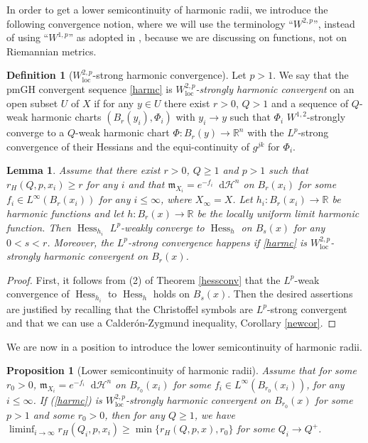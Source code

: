 \documentclass[11pt,reqno]{amsart}
\newtheorem{lemma}[theorem]{Lemma}
\newtheorem{proposition}[theorem]{Proposition}
\theoremstyle{definition}
\newtheorem{definition}[theorem]{Definition}
\numberwithin{equation}{section}
\newcommand{\di}{\mathop{}\!\mathrm{d}}
\newcommand{\meas}{\mathfrak{m}}
\DeclareMathOperator{\Hess}{Hess}
\DeclareMathOperator{\loc}{loc}
\newcommand{\haus}{\mathscr{H}}
\begin{document}
In order to get a lower semicontinuity of harmonic radii, we introduce the following convergence notion, where we will use the terminology ``$W^{2,p}$'', instead of using ``$W^{1,p}$'' as adopted in \cite{AC}, because we are discussing on functions, not on Riemannian metrics.
\begin{definition}[$W^{2,p}_{\loc}$-strong harmonic convergence]\label{harmonicconv}
Let $p>1$. We say that the pmGH convergent sequence \eqref{harmc} is \textit{$W^{2, p}_{\loc}$-strongly harmonic convergent} on an open subset $U$ of $X$ if for any $y \in U$ there exist $r>0$, $Q>1$ and a sequence of $Q$-weak harmonic charts $(B_r(y_i), \Phi_i)$ with $y_i \to y$ such that $\Phi_i$ $W^{1,2}$-strongly converge to a $Q$-weak harmonic chart $\Phi:B_r(y) \to \mathbb{R}^n$ with the $L^p$-strong convergence of their Hessians and the equi-continuity of $g^{jk}$ for $\Phi_i$.
\end{definition}
\begin{lemma} \label{stronglp}
Assume
that  there exist $r>0$, $Q\ge 1$ and $p>1$ such that
$
        r_H(Q, p, x_i)\ge r$ for any $i$
    and that 
    $\meas_{X_i}=e^{-f_i}\di\haus^n$ on $B_r(x_i)$ for some $f_i \in L^{\infty}(B_r(x_i))$ for any $i \le \infty$, where $X_{\infty}=X$.
Let $h_i:B_r(x_i) \to \mathbb{R}$ be harmonic functions  
and let $h:B_r(x) \to \mathbb{R}$ be the locally uniform limit harmonic function. Then $\Hess_{h_i}$ $L^p$-weakly converge to $\Hess_h$ on $B_s(x)$ for any $0<s<r$. Moreover, the $L^p$-strong convergence happens if \eqref{harmc} is $W^{2,p}_{\loc}$-strongly harmonic convergent on $B_r(x)$.
\end{lemma}
\begin{proof}
First, it follows from (2) of Theorem \ref{hessconv} 
that the $L^p$-weak convergence of $\Hess_{h_i}$ to $\Hess_h$ holds on $B_s(x)$.
Then the desired assertions are justified by recalling that the Christoffel symbols are $L^p$-strong convergent and that we can use a Calder{\'o}n-Zygmund inequality, Corollary \ref{newcor}. 
\end{proof}
We are now in a position to introduce the lower semicontinuity of harmonic radii.
\begin{proposition}[Lower semicontinuity of harmonic radii]\label{contharrad}
Assume that for some $r_0>0$,
$
    \meas_{X_i}=e^{-f_i}\di\haus^n$
     on $B_{r_0}(x_i)$ for some $f_i \in L^{\infty}(B_{r_0}(x_i))$, for any $i \le \infty$.
If (\ref{harmc}) is $W^{2, p}_{\loc}$-strongly harmonic convergent on $B_{r_0}(x)$ for some $p>1$ and some $r_0>0$, then for any $Q\ge 1$, we have
$
\liminf_{i \to \infty}r_H(Q_i, p, x_i) \ge \min \{r_H(Q, p, x), r_0\}$
 for some $Q_i \to Q^+$.
\end{proposition}
\end{document}
